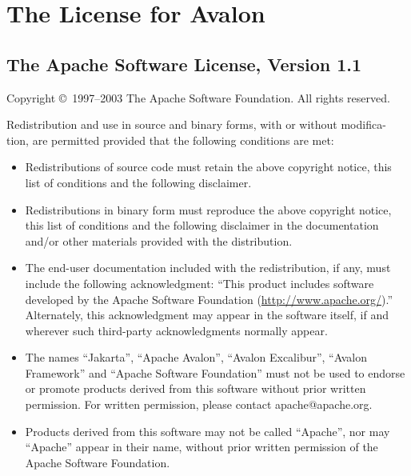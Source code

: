 
\section{The License for Avalon}

\begin{multicols}{3}\tiny\sf%

  \subsection*{The Apache Software License, Version 1.1}
  
  Copyright \copyright\ 1997--2003 The Apache Software Foundation. All
  rights reserved.
 
  Redistribution and use in source and binary forms, with or without
  modifica- tion, are permitted provided that the following conditions
  are met:

  \begin{itemize}
  \item [1.]  Redistributions of source code must retain the above
    copyright notice, this list of conditions and the following
    disclaimer.
    
  \item [2.] Redistributions in binary form must reproduce the above
    copyright notice, this list of conditions and the following
    disclaimer in the documentation and/or other materials provided
    with the distribution.
 
  \item [3.] The end-user documentation included with the
    redistribution, if any, must include the following acknowledgment:
    ``This product includes software developed by the Apache Software
    Foundation (\url{http://www.apache.org/}).''  Alternately, this
    acknowledgment may appear in the software itself, if and wherever
    such third-party acknowledgments normally appear.
    
  \item [4.] The names ``Jakarta'', ``Apache Avalon'', ``Avalon
    Excalibur'', ``Avalon Framework'' and ``Apache Software
    Foundation'' must not be used to endorse or promote products
    derived from this software without prior written permission. For
    written permission, please contact apache@apache.org.
   
  \item [5.] Products derived from this software may not be called
    ``Apache'', nor may ``Apache'' appear in their name, without prior
    written permission of the Apache Software Foundation.
 

\end{itemize}
\end{multicols}

